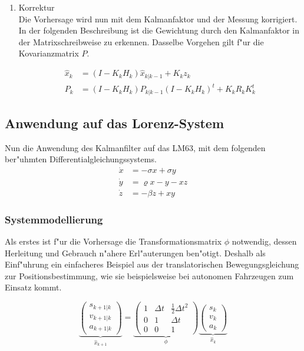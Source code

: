 \begin{refsection}
\begin{enumerate}
\item Korrektur\\
Die Vorhersage wird nun mit dem Kalmanfaktor und der Messung korrigiert. In der folgenden Beschreibung ist die Gewichtung durch den Kalmanfaktor in der Matrixschreibweise zu erkennen. Dasselbe Vorgehen gilt f"ur die Kovarianzmatrix $P$.

\begin{align*}
\hat{x}_{k}&=(I-K_{k}H_{k})\hat{x}_{k|k-1}+K_{k}z_{k} \\
P_{k} &=(I-K_{k}H_{k})P_{k|k-1}(I-K_{k}H_{k})^{t}+K_{k}R_{k}K^{t}_{k}  \end{align*}
\end{enumerate}

\subsection{Anwendung auf das Lorenz-System}
Nun die Anwendung des Kalmanfilter auf das LM63, mit dem folgenden ber"uhmten Differentialgleichungssystems.
\begin{align}
\dot x &= -\sigma x + \sigma y\\
\dot y &= \varrho x - y - x z\\
\dot z &= -\beta z + x y
\label{kalman:lm63} 
\end{align}

\subsubsection{Systemmodellierung}
Als erstes ist f"ur die Vorhersage die Transformationsmatrix $\phi$ notwendig, dessen Herleitung und Gebrauch n"ahere Erl"auterungen ben"otigt. Deshalb als Einf"uhrung ein einfacheres Beispiel aus der translatorischen Bewegungsgleichung zur Positionsbestimmung, wie sie beispielsweise bei autonomen Fahrzeugen zum Einsatz kommt.

\[
\underbrace{\begin{pmatrix}
s_{k+1|k} \\ 
v_{k+1|k} \\ 
a_{k+1|k}
\end{pmatrix}}_{\hat{x}_{k+1}}
=
\underbrace{\begin{pmatrix}
 1 & \Delta t & \frac{1}{2}\Delta t^{2} \\ 
 0 & 1 & \Delta t \\ 
 0 & 0 & 1
 \end{pmatrix}}_{\phi}
\underbrace{\begin{pmatrix}
   s_{k} \\ 
   v_{k} \\ 
   a_{k}
   \end{pmatrix}}_{\hat{x}_{k}}
\]


\end{refsection}
